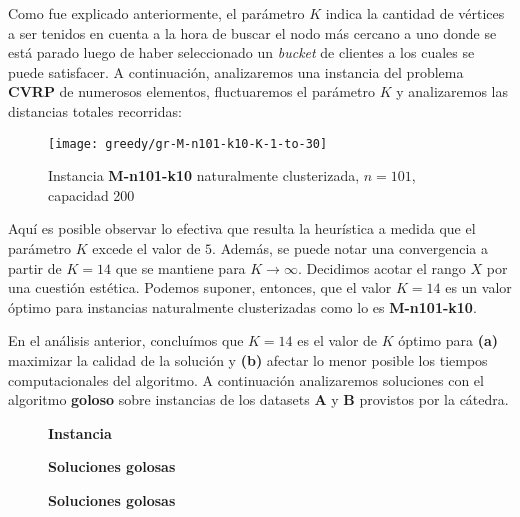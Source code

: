 Como fue explicado anteriormente, el parámetro $K$ indica la cantidad de vértices a ser tenidos en cuenta a la hora de buscar el nodo más cercano a uno donde se está parado luego de haber seleccionado un \textit{bucket} de clientes a los cuales se puede satisfacer. A continuación, analizaremos una instancia del problema \textbf{CVRP} de numerosos elementos, fluctuaremos el parámetro $K$ y analizaremos las distancias totales recorridas:

\begin{figure}[H]
	\centering
	\texttt{[image: greedy/gr-M-n101-k10-K-1-to-30]}
	\caption{\footnotesize Instancia \textbf{M-n101-k10} naturalmente clusterizada, $n=101$, capacidad 200}
	\label{fig:gr-M-n101-k10-K-1-to-30}
\end{figure}

Aquí es posible observar lo efectiva que resulta la heurística a medida que el parámetro $K$ excede el valor de $5$. Además, se puede notar una convergencia a partir de $K=14$ que se mantiene para $K \rightarrow \infty$. Decidimos acotar el rango $X$ por una cuestión estética. Podemos suponer, entonces, que el valor $K=14$ es un valor óptimo para instancias naturalmente clusterizadas como lo es \textbf{M-n101-k10}.

En el análisis anterior, concluímos que $K=14$ es el valor de $K$ óptimo para \textbf{(a)} maximizar la calidad de la solución y \textbf{(b)} afectar lo menor posible los tiempos computacionales del algoritmo. A continuación analizaremos soluciones con el algoritmo \textbf{goloso} sobre instancias de los datasets \textbf{A} y \textbf{B} provistos por la cátedra.

\begin{figure}[H]
	\begin{minipage}{0.15\textwidth}
		\centering
		\textbf{Instancia}
	\end{minipage}%
	\begin{minipage}{0.40\textwidth}
		\centering
		\textbf{Soluciones golosas}
	\end{minipage}%
	\hspace{0.03\textwidth}
	\begin{minipage}{0.40\textwidth}
		\centering
		\textbf{Soluciones golosas}
	\end{minipage}%
\end{figure}

